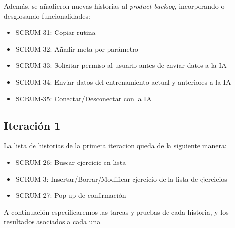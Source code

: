 Además, se añadieron nuevas historias al \textit{product backlog}, incorporando o desglosando funcionalidades:

\begin{itemize}
  \item SCRUM-31: Copiar rutina
  \item SCRUM-32: Añadir meta por parámetro
  \item SCRUM-33: Solicitar permiso al usuario antes de enviar datos a la IA
  \item SCRUM-34: Enviar datos del entrenamiento actual y anteriores a la IA
  \item SCRUM-35: Conectar/Desconectar con la IA
\end{itemize}



\subsection{Iteración 1}
La lista de historias de la primera iteracion queda de la siguiente manera:

\begin{itemize}
    \item SCRUM-26: Buscar ejercicio en lista
    \item SCRUM-3: Insertar/Borrar/Modificar ejercicio de la lista de ejercicios
    \item SCRUM-27: Pop up de confirmación
\end{itemize}

A continuación especificaremos las tareas y pruebas de cada historia, y los resultados asociados a cada una. 


